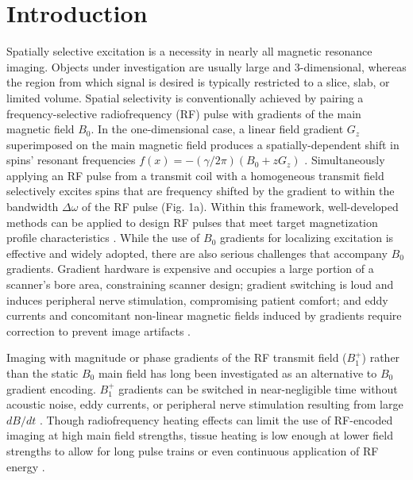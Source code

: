 \documentclass{article}
\begin{document}
\section*{Introduction}
Spatially selective excitation is a necessity in nearly all magnetic resonance imaging. 
Objects under investigation are usually large and 3-dimensional, 
whereas the region from which signal is desired is typically restricted to a slice, slab, or limited volume. 
Spatial selectivity is conventionally achieved by pairing a frequency-selective radiofrequency (RF) 
pulse with gradients of the main magnetic field $B_0$. 
In the one-dimensional case, 
a linear field gradient $G_z$ superimposed on the main magnetic field produces a spatially-dependent shift in spins' resonant frequencies $f(x) = -(\gamma/2\pi)(B_0 + zG_z)$ \cite{Mansfield1977Multi-planarEchoes}. 
Simultaneously applying an RF pulse from a transmit coil with a homogeneous 
transmit field selectively excites spins that are frequency shifted by the gradient to within the bandwidth $\Delta\omega$ of the RF pulse (Fig. 1a). Within this framework, 
well-developed methods can be applied to design RF pulses that meet 
target magnetization profile characteristics \cite{Conolly1986OptimalProblem, Pauly1991ParameterAlgorithm}. 
While the use of $B_0$ gradients for localizing excitation is effective and widely adopted, 
there are also serious challenges that accompany $B_0$ gradients. 
Gradient hardware is expensive and occupies a large portion of a scanner's bore area, 
constraining scanner design; gradient switching is loud and induces peripheral nerve stimulation, 
compromising patient comfort; and eddy currents and concomitant non-linear magnetic fields induced by gradients require correction to prevent image artifacts \cite{Bernstein1998ConcomitantCorrection, Spees2011QuantificationGradients}.

\par Imaging with magnitude or phase gradients of the RF transmit field ($B_1^+$) rather than the static $B_0$ main field has long been investigated as an alternative \cite{Hoult1979RotatingZeugmatography,Sharp2010MRIGradients,Kartausch2014SpatialEffect, Torres2021B1-gradientbasedEchoes} to $B_0$ gradient encoding. 
$B_1^+$ gradients can be switched in near-negligible time without acoustic noise, eddy currents, 
or peripheral nerve stimulation resulting from large $dB/dt$ \cite{Canet1997RadiofrequencyExperiments}. 
Though radiofrequency heating effects can limit the use of RF-encoded imaging at high main field strengths, 
tissue heating is low enough at lower field strengths to allow for long pulse trains or even continuous application of RF energy \cite{Kartausch2014SpatialEffect}. 
\end{document}

